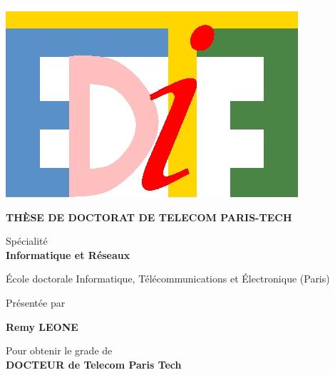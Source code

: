 \includegraphics[scale=.5]{img/logos/edite.eps}

{\large

\vspace*{0.5cm}

\begin{center}

{\bf THÈSE DE DOCTORAT DE TELECOM PARIS-TECH}

\vspace*{0.5cm}

Spécialité \\ [2ex]
{\bf Informatique et Réseaux}\ \\ 

\vspace*{0.5cm}

École doctorale Informatique, Télécommunications et Électronique (Paris)

\vspace*{1cm}


Présentée par \ \\


\vspace*{0.5cm}


{\Large {\bf Remy LEONE}}

\vspace*{1cm}
Pour obtenir le grade de \ \\[1ex]
{\bf DOCTEUR de Telecom Paris Tech} \ \\

\vspace*{1cm}

\end{center}

}
